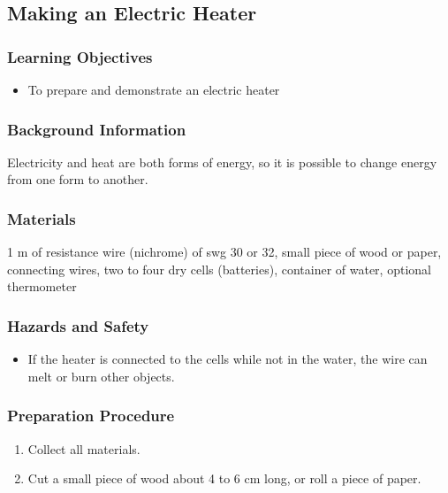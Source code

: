 \subsection{Making an Electric Heater}

\subsubsection*{Learning Objectives}
\begin{itemize}
\item{To prepare and demonstrate an electric heater} 
\end{itemize}

\subsubsection*{Background Information}
Electricity and heat are both forms of energy, so it is possible to change energy from one form to another.  

\subsubsection*{Materials}
1 m of resistance wire (nichrome) of swg 30 or 32, small piece of wood or paper, connecting wires, two to four dry cells (batteries), container of water, optional thermometer

\subsubsection*{Hazards and Safety}
\begin{itemize}
\item{If the heater is connected to the cells while not in the water, the wire can melt or burn other objects.} 
\end{itemize}

\subsubsection*{Preparation Procedure}
\begin{enumerate}
\item{Collect all materials.} 
\item{Cut a small piece of wood about 4 to 6 cm long, or roll a piece of paper.} 
\end{enumerate}

